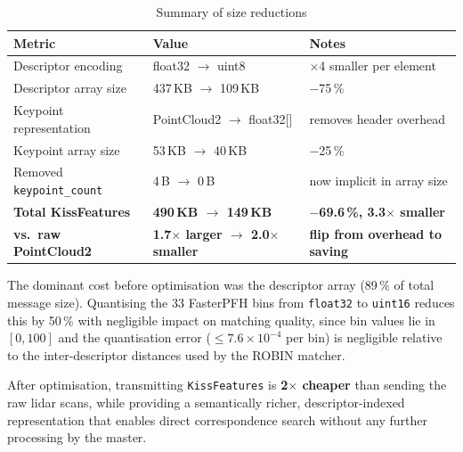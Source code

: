\documentclass[a4paper,11pt]{article}
\begin{document}
\begin{table}[h]
\centering
\caption{Summary of size reductions}
\label{tab:summary}
\begin{tabular}{lll}
\toprule
\textbf{Metric} & \textbf{Value} & \textbf{Notes} \\
\midrule
\rowcolor{rowgray}
Descriptor encoding      & float32 $\to$ uint8        & $\times$4 smaller per element \\
Descriptor array size    & 437\,KB $\to$ 109\,KB      & $-$75\,\% \\
\rowcolor{rowgray}
Keypoint representation  & PointCloud2 $\to$ float32{[]} & removes header overhead \\
Keypoint array size      & 53\,KB $\to$ 40\,KB        & $-$25\,\% \\
\rowcolor{rowgray}
Removed \texttt{keypoint\_count} & 4\,B $\to$ 0\,B    & now implicit in array size \\
\midrule
\rowcolor{highlight}
\textbf{Total KissFeatures} &
  \textbf{490\,KB $\to$ 149\,KB} &
  \textbf{$-$69.6\,\%, 3.3$\times$ smaller} \\
\rowcolor{highlight}
\textbf{vs.\ raw PointCloud2} &
  \textbf{1.7$\times$ larger $\to$ 2.0$\times$ smaller} &
  \textbf{flip from overhead to saving} \\
\bottomrule
\end{tabular}
\end{table}

The dominant cost before optimisation was the descriptor array (89\,\% of total
message size). Quantising the 33 FasterPFH bins from \texttt{float32} to
\texttt{uint16} reduces this by 50\,\% with negligible impact on matching
quality, since bin values lie in $[0,100]$ and the quantisation error
($\leq 7.6\times10^{-4}$ per bin) is negligible relative to the
inter-descriptor distances used by the ROBIN matcher.

After optimisation, transmitting \texttt{KissFeatures} is \textbf{2$\times$
cheaper} than sending the raw lidar scans, while providing a semantically
richer, descriptor-indexed representation that enables direct correspondence
search without any further processing by the master.
\end{document}
